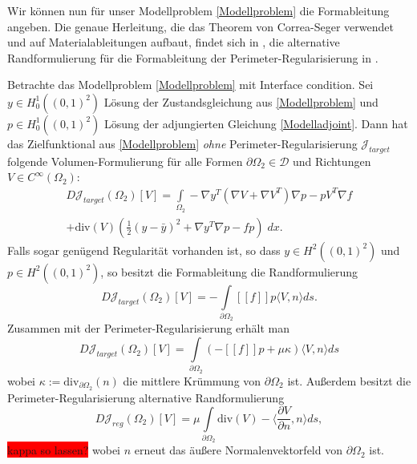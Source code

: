 Wir können nun für unser Modellproblem \ref{Modellproblem} die Formableitung angeben. Die genaue Herleitung, die das Theorem von Correa-Seger verwendet und auf  Materialableitungen aufbaut, findet sich in \cite{shape_space}, die alternative Randformulierung für die Formableitung der Perimeter-Regularisierung in \cite{multigrid}.

\begin{theorem}
	Betrachte das Modellproblem \ref{Modellproblem} mit Interface condition. Sei $y\in H^1_0((0,1)^2)$ Lösung der Zustandsgleichung aus \ref{Modellproblem} und $p\in H^1_0((0,1)^2)$ Lösung der adjungierten Gleichung \ref{Modelladjoint}. Dann hat das Zielfunktional aus \ref{Modellproblem} \textit{ohne} Perimeter-Regularisierung $\mathcal{J}_{target}$ folgende Volumen-Formulierung für alle Formen $\partial\Omega_2 \in \mathcal{D}$ und Richtungen $V \in C^\infty(\Omega_2)$:
	\begin{equation}
	\begin{aligned}
		D\mathcal{J}_{target}(\Omega_2)[V] = \underset{\Omega_2}{\int} -\nabla y^T (\nabla V + \nabla V^T) \nabla p - p V^T \nabla f \\ + \text{div} (V) (\frac{1}{2}(y-\bar{y})^2 + \nabla y^T \nabla p - fp)\; dx.
	\end{aligned}
	\end{equation}
	Falls sogar genügend Regularität vorhanden ist, so dass $y \in H^2((0,1)^2)$ und $p \in H^2((0,1)^2)$, so besitzt die Formableitung die Randformulierung
	\begin{equation}
	D\mathcal{J}_{target}(\Omega_2)[V] = -\underset{\partial\Omega_2}{\int} [[f]]p \langle V,n \rangle ds.
	\end{equation}
	Zusammen mit der Perimeter-Regularisierung erhält man
	\begin{equation}
	D\mathcal{J}_{target}(\Omega_2)[V] = \underset{\partial\Omega_2}{\int} (-[[f]]p  + \mu\kappa )\langle V,n \rangle ds 
	\end{equation}
	wobei $\kappa := \text{div}_{\partial\Omega_2}(n)$ die mittlere Krümmung von $\partial\Omega_2$ ist. Außerdem besitzt die Perimeter-Regularisierung alternative  Randformulierung
	\begin{equation}
	D\mathcal{J}_{reg}(\Omega_2)[V] = \mu\underset{\partial\Omega_2}{\int} \text{div}(V) - \langle\frac{\partial V}{\partial n}, n\rangle ds,
	\end{equation}\colorbox{red}{kappa so lassen?}
	wobei $n$ erneut das äußere Normalenvektorfeld von $\partial\Omega_2$ ist.
\end{theorem}

